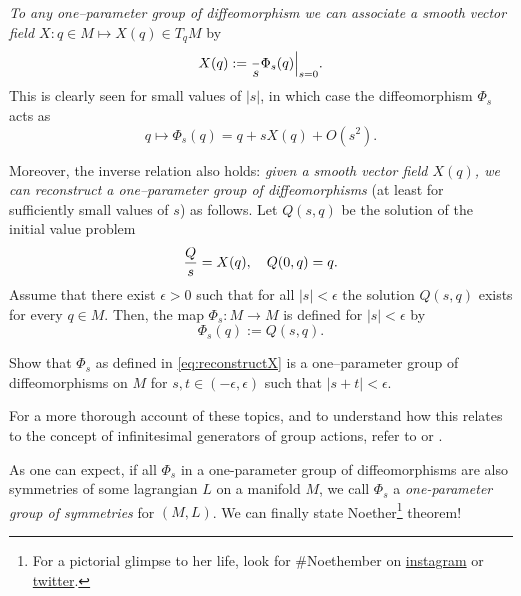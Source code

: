 \documentclass[english,fontsize=11pt,paper=a5,oneside]{scrbook}
\let\d\relax
\newcommand{\d}{\mathrm{d}}
\theoremstyle{definition}
\newenvironment{remark}
  {\pushQED{\qed}\renewcommand{\qedsymbol}{$\lozenge$}\remarkx}
  {\popQED\endremarkx}
\newenvironment{exercise}
  {\pushQED{\qed}\renewcommand{\qedsymbol}{$\maltese$}\exercisex}
  {\popQED\endexercisex}
\begin{document}
\begin{remark}
  \emph{To any one--parameter group of diffeomorphism we can associate a smooth vector field $X : q\in M \mapsto X(q)\in T_qM$} by
  \begin{equation}
    X(q) := \frac{\d}{\d s} \Phi_s(q) \Big|_{s=0}.
  \end{equation}
  This is clearly seen for small values of $|s|$, in which case the diffeomorphism $\Phi_s$ acts as
  \begin{equation}\label{eq:infinitesimalSymmetryExp}
    q \mapsto \Phi_s(q) = q + s X(q) + O(s^2).
  \end{equation}

  Moreover, the inverse relation also holds: \emph{given a smooth vector field $X(q)$, we can reconstruct a one--parameter group of diffeomorphisms} (at least for sufficiently small values of $s$) as follows.
  Let $Q(s, q)$ be the solution of the initial value problem
  \begin{equation}\label{eq:NoetherCoords}
    \frac{\d Q}{\d s} = X(q), \quad Q(0, q) = q.
  \end{equation}
  Assume that there exist $\epsilon >0$ such that for all $|s|<\epsilon$ the solution $Q(s,q)$ exists for every $q\in M$.
  Then, the map $\Phi_s:M\to M$ is defined for $|s|<\epsilon$ by
  \begin{equation}\label{eq:reconstructX}
    \Phi_s(q) := Q(s, q).
  \end{equation}

  \begin{exercise}
    Show that $\Phi_s$ as defined in \eqref{eq:reconstructX} is a one--parameter group of diffeomorphisms on $M$ for $s,t \in(-\epsilon,\epsilon)$ such that $|s + t| < \epsilon$.
  \end{exercise}

  For a more thorough account of these topics, and to understand how this relates to the concept of infinitesimal generators of group actions, refer to \cite[Chapters 9 and 20]{book:lee} or \cite[Chapters 3 and 4]{lectures:aom:seri}.
\end{remark}

As one can expect, if all $\Phi_s$ in a one-parameter group of diffeomorphisms are also symmetries of some lagrangian $L$ on a manifold $M$, we call $\Phi_s$ a \emph{one-parameter group of symmetries} for $(M,L)$. We can finally state Noether\footnote{For a pictorial glimpse to her life, look for \#Noethember on \href{https://www.instagram.com/explore/tags/noethember/}{instagram} or \href{https://twitter.com/search?q=noethember}{twitter}.} theorem!
\end{document}
